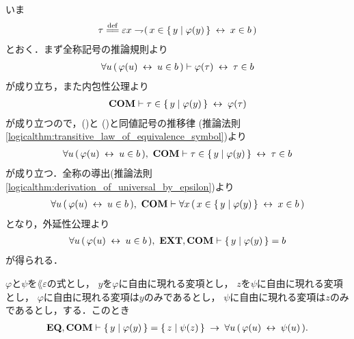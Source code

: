 	\begin{sketch}
		いま
		\begin{align}
			\tau \defeq 
			\varepsilon x \negation (\, x \in \Set{y}{\varphi(y)} \lrarrow x \in b\, )
		\end{align}
		とおく．まず全称記号の推論規則より
		\begin{align}
			\forall u\, (\, \varphi(u) \hspace{0.25em}\leftrightarrow\hspace{0.25em} u \in b\, )
			\vdash \varphi(\tau) \hspace{0.25em}\leftrightarrow\hspace{0.25em} \tau \in b
			\label{fom:equivalent_formula_rewriting_4_1}
		\end{align}
		が成り立ち，また内包性公理より
		\begin{align}
			\mbox{\bf COM} \vdash \tau \in \left\{\, y \mid \varphi(y)\, \right\} \hspace{0.25em}\leftrightarrow\hspace{0.25em} \varphi(\tau)
			\label{fom:equivalent_formula_rewriting_4_2}
		\end{align}
		が成り立つので，()と
		()と同値記号の推移律
		(推論法則\ref{logicalthm:transitive_law_of_equivalence_symbol})より
		\begin{align}
			\forall u\, (\, \varphi(u) \hspace{0.25em}\leftrightarrow\hspace{0.25em} u \in b\, ),\ \mbox{\bf COM} \vdash
			\tau \in \left\{\, y \mid \varphi(y)\, \right\} \hspace{0.25em}\leftrightarrow\hspace{0.25em} \tau \in b
		\end{align}
		が成り立つ．全称の導出(推論法則\ref{logicalthm:derivation_of_universal_by_epsilon})より
		\begin{align}
			\forall u\, (\, \varphi(u) \hspace{0.25em}\leftrightarrow\hspace{0.25em} u \in b\, ),\ \mbox{\bf COM} \vdash
			\forall x\, (\, x \in \left\{\, y \mid \varphi(y)\, \right\} \hspace{0.25em}\leftrightarrow\hspace{0.25em} x \in b\, )
		\end{align}
		となり，外延性公理より
		\begin{align}
			\forall u\, (\, \varphi(u) \lrarrow u \in b\, ),\ \EXTAX,\COMAX \vdash
			\Set{y}{\varphi(y)} = b
		\end{align}
		が得られる．
		\QED
	\end{sketch}
	
	\begin{screen}
		\begin{thm}
		\label{thm:equivalent_formula_rewriting_5}
			$\varphi$と$\psi$を$\lang{\varepsilon}$の式とし，
			$y$を$\varphi$に自由に現れる変項とし，
			$z$を$\psi$に自由に現れる変項とし，
			$\varphi$に自由に現れる変項は$y$のみであるとし，
			$\psi$に自由に現れる変項は$z$のみであるとし，する．このとき
			\begin{align}
				\mbox{{\bf EQ}},\mbox{\bf COM} \vdash \left\{\, y \mid \varphi(y)\, \right\} = \left\{\, z \mid \psi(z)\, \right\}
				\hspace{0.25em}\rightarrow\hspace{0.25em} \forall u\, (\, \varphi(u) \hspace{0.25em}\leftrightarrow\hspace{0.25em} \psi(u)\, ).
			\end{align}
		\end{thm}
	\end{screen}
	

